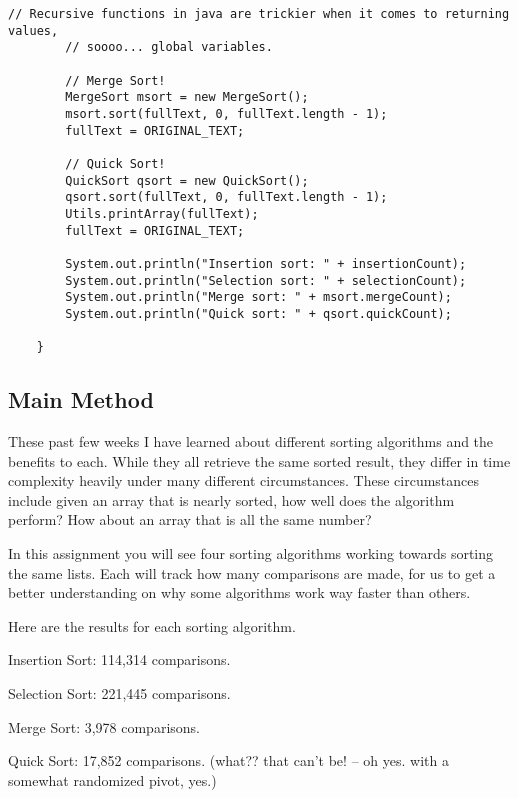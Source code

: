 \documentclass[letterpaper, 10pt,DIV=13]{scrartcl}
\numberwithin{equation}{section} %
\numberwithin{figure}{section} %
\numberwithin{table}{section} %
\begin{document}
\begin{lstlisting}[frame=single, ]
        // Recursive functions in java are trickier when it comes to returning values,
        // soooo... global variables.

        // Merge Sort!
        MergeSort msort = new MergeSort();
        msort.sort(fullText, 0, fullText.length - 1);
        fullText = ORIGINAL_TEXT;

        // Quick Sort!
        QuickSort qsort = new QuickSort();
        qsort.sort(fullText, 0, fullText.length - 1);
        Utils.printArray(fullText);
        fullText = ORIGINAL_TEXT;

        System.out.println("Insertion sort: " + insertionCount);
        System.out.println("Selection sort: " + selectionCount);
        System.out.println("Merge sort: " + msort.mergeCount);
        System.out.println("Quick sort: " + qsort.quickCount);

    }
\end{lstlisting}

\subsection{Main Method}
These past few weeks I have learned about different sorting algorithms and the benefits to each. While they all retrieve the same sorted result, they differ in time complexity heavily under many different circumstances. These circumstances include given an array that is nearly sorted, how well does the algorithm perform? How about an array that is all the same number? 

In this assignment you will see four sorting algorithms working towards sorting the same lists. Each will track how many comparisons are made, for us to get a better understanding on why some algorithms work way faster than others. 

Here are the results for each sorting algorithm.

Insertion Sort: 114,314 comparisons.

Selection Sort: 221,445 comparisons.

Merge Sort: 3,978 comparisons.

Quick Sort: 17,852 comparisons. (what?? that can't be! -- oh yes. with a somewhat randomized pivot, yes.)
\end{document}
